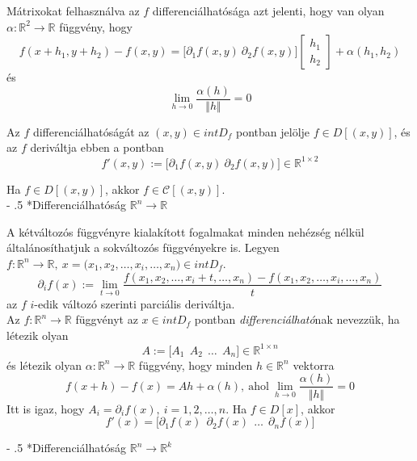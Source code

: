 \documentclass[12pt,margin=0px]{article}
\makeatletter
\newcommand\ddfrac[2]{\frac{\displaystyle #1}{\displaystyle #2}}
\renewcommand\paragraph{%
	\@startsection{paragraph}{4}{0mm}%
	{-\baselineskip}%
	{.5\baselineskip}%
	{\normalfont\normalsize\bfseries}}
\makeatother
\begin{document}
     \noindent Mátrixokat felhasználva az $f$ differenciálhatósága azt jelenti, hogy van olyan $\alpha: \mathbb{R}^2 \to \mathbb{R}$ függvény, hogy
     \[
        f(x + h_1, y + h_2) - f(x, y) = \Big[\partial_1 f(x,y)\ \partial_2 f(x, y)\Big]\left[\begin{array}{c} h_1 \\ h_2 \end{array}\right] + \alpha(h_1, h_2)
     \]
     és
     \[
        \lim\limits_{h \to 0} \ddfrac{\alpha(h)}{\Vert h \Vert} = 0
     \]

     \noindent Az $f$ differenciálhatóságát az $(x,y) \in int D_f$ pontban jelölje $f \in D[(x,y)]$, és az $f$ deriváltja ebben a pontban
     \[
        f'(x,y) := \Big[\partial_1 f(x,y)\ \partial_2 f(x, y)\Big] \in \mathbb{R}^{1 \times 2}
     \]

     \noindent Ha $f \in D[(x,y)]$, akkor $f \in \mathcal{C}[(x,y)]$.\\

     \paragraph*{Differenciálhatóság $\mathbb{R}^n \to \mathbb{R}$}

     \noindent A kétváltozós függvényre kialakított fogalmakat minden nehézség nélkül általánosíthatjuk a sokváltozós függvényekre is.
     \noindent Legyen $f: \mathbb{R}^{n} \to \mathbb{R},\ x = \Big(x_1, x_2, \ldots, x_i, \ldots, x_n\Big) \in int D_f$.
     \[
        \partial_{i} f(x) := \lim\limits_{t \to 0}\ddfrac{f(x_1, x_2, \ldots, x_{i} + t, \ldots, x_n) - f(x_1, x_2, \ldots, x_i, \ldots, x_n)}{t}
     \]
     az $f$ $i$-edik változó szerinti parciális deriváltja.\\

     \noindent Az $f: \mathbb{R}^{n} \to \mathbb{R}$ függvényt az $x \in int D_f$ pontban \emph{differenciálható}nak nevezzük, ha létezik olyan
     \[
        A := \Big[A_1\ \ A_2\ \ \ldots\ \ A_n\Big] \in \mathbb{R}^{1 \times n}
     \]
     és létezik olyan $\alpha:\mathbb{R}^{n} \to \mathbb{R}$ függvény, hogy minden $h \in \mathbb{R}^{n}$ vektorra
     \[
        f(x + h) - f(x) = Ah + \alpha(h),\ \text{ahol}\ \lim\limits_{h \to 0} \ddfrac{\alpha(h)}{\Vert h \Vert} = 0
     \]
     Itt is igaz, hogy $A_i = \partial_i f(x),\ i = 1, 2, \ldots, n$. Ha $f \in D[x]$, akkor
     \[
        f'(x) = \Big[\partial_1 f(x)\ \ \partial_2 f(x)\ \ \ldots\ \ \partial_n f(x)\Big]
     \]

     \paragraph*{Differenciálhatóság $\mathbb{R}^n \to \mathbb{R}^k$}
\end{document}
